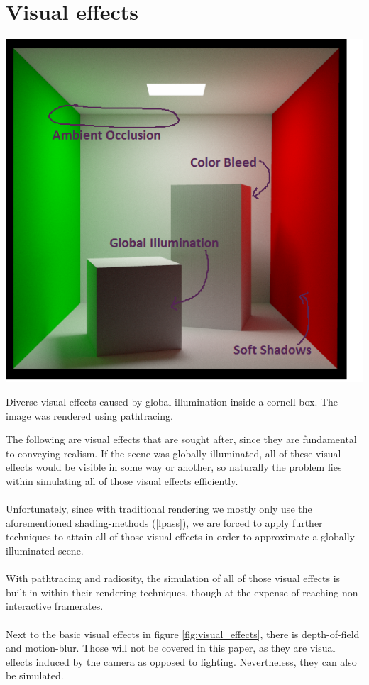 \documentclass{ACGSeminar}
\begin{document}
\section{Visual effects} 
	\begin{floatingfigure}[l]{.5\textwidth} %
		\includegraphics[width=.5\textwidth]{img/visual_effects.png} %
			
		\caption{Diverse visual effects caused by global illumination inside a cornell box. The image was rendered using pathtracing.}%
		\label{fig:visual_effects}%
	\end{floatingfigure} %

	The following are visual effects that are sought after, since they are fundamental to conveying realism. If the scene was globally illuminated, all of these visual effects would be visible in some way or another, so naturally the problem lies within simulating all of those visual effects efficiently. \\\\
	Unfortunately, since with traditional rendering we mostly only use the aforementioned shading-methods (\ref{lpass}), we are forced to apply further techniques to attain all of those visual effects in order to approximate a globally illuminated scene. \\\\
	With pathtracing and radiosity, the simulation of all of those visual effects is built-in within their rendering techniques, though at the expense of reaching non-interactive framerates. \\\\
	Next to the basic visual effects in figure \ref{fig:visual_effects}, there is depth-of-field and motion-blur. Those will not be covered in this paper, as they are visual effects induced by the camera as opposed to lighting. Nevertheless, they can also be simulated.
\end{document}
